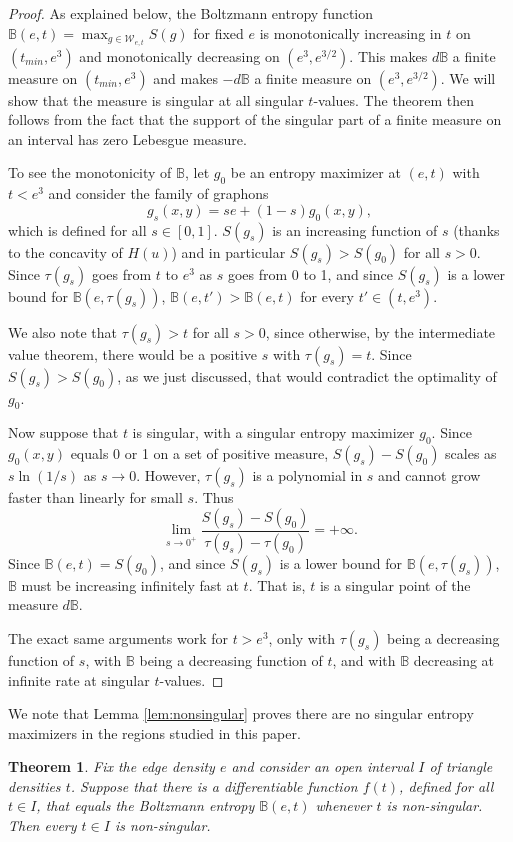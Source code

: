 \documentclass[12pt]{amsart}
\newtheorem{theorem}[lemma]{Theorem}
\newcommand\be{\begin{equation}}
\newcommand\ee{\end{equation}}
\newcommand{\tdens}{\tau}
\newcommand{\B}{\mathbb{B}}
\newcommand{\regular}{\mathcal{W}}
\begin{document}
{\begin{proof} As explained below, the Boltzmann entropy function $\B(e,t)=\max_{g\in \regular_{e,t}} S(g)$ 
for fixed $e$ is monotonically increasing
in $t$ on $(t_{min}, e^3)$ and monotonically decreasing on $(e^3, e^{3/2})$. This 
makes $d\B$ a finite measure on $(t_{min},e^3)$ and makes $-d\B$ a finite measure on $(e^3,e^{3/2})$.
We will show that the measure is singular at all singular $t$-values. The theorem then follows from the 
fact that the support of the singular part of a finite measure on an interval has zero Lebesgue measure. 

To see the monotonicity of $\B$, let $g_0$ be an entropy maximizer at $(e,t)$ with $t<e^3$
and consider the family of graphons 
\be \label{eq:g-s} g_s(x,y) = se + (1-s) g_0(x,y), \ee
which is defined for all $s \in [0,1]$. $S(g_s)$ is an increasing function of $s$ (thanks to the 
concavity of $H(u)$) and in particular $S(g_s)>S(g_0)$ for all $s>0$. 
Since $\tdens(g_s)$ goes from $t$ to $e^3$ as $s$ goes from 0 to 1, 
and since $S(g_s)$ is a lower bound for $\B(e, \tdens(g_s))$, 
$\B(e, t') > \B(e,t)$ for every $t' \in (t,e^3)$. 

We also note that $\tdens(g_s)>t$ for all $s>0$, since otherwise, by the 
intermediate value theorem, there would be a positive $s$ with $\tdens(g_s)=t$. Since $S(g_s)>S(g_0)$,
as we just discussed, that would contradict the optimality of $g_0$. 

Now suppose that $t$ is singular, with a singular entropy maximizer $g_0$. 
Since $g_0(x,y)$ equals 0 or 1 on a set of positive measure, $S(g_s)-S(g_0)$ scales as $s \ln(1/s)$ as $s 
\to 0$. However, $\tdens(g_s)$ is
a polynomial in $s$ and cannot grow faster than linearly for small $s$. Thus 
\be \lim_{s \to 0^+} \frac{S(g_s)-S(g_0)}{\tdens(g_s)-\tdens(g_0)} = +\infty.  \ee
Since $\B(e,t)=S(g_0)$, and since $S(g_s)$ is a lower bound for $\B(e, \tdens(g_s))$, 
$\B$ must be
increasing infinitely fast at $t$. That is, $t$ is a singular point of the measure $d \B$. 

The exact same arguments work for $t>e^3$, only with $\tdens(g_s)$ being a decreasing function of $s$,
with $\B$ being a decreasing function of $t$,
and with $\B$ decreasing at infinite rate at singular $t$-values.  \end{proof} 

We note that Lemma \ref{lem:nonsingular} proves there are no singular entropy maximizers in the regions studied in this paper.

\begin{theorem} \label{thm:no-singular} 
Fix the edge density $e$ and consider an open interval $I$ of triangle densities $t$. Suppose that there is a
differentiable function $f(t)$, defined for all $t \in I$, that equals the Boltzmann entropy $\B(e,t)$ 
whenever $t$ is non-singular. Then every $t \in I$ is non-singular. 
\end{theorem} 

}
\end{document}

